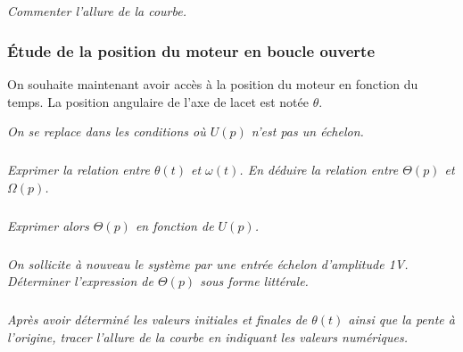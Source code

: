 \documentclass[11pt,oneside]{article}
\begin{document}
\subparagraph{}
\textit{Commenter l'allure de la courbe.}


\subsubsection*{Étude de la position du moteur en boucle ouverte}
On souhaite maintenant avoir accès à la position du moteur en fonction du temps. La position angulaire de l'axe de lacet est notée $\theta$. 

\textit{On se replace dans les conditions où $U(p)$ n'est pas un échelon.}




\subparagraph{}
\textit{Exprimer la relation entre $\theta(t)$ et $\omega(t)$. En déduire la relation entre $\Theta(p)$ et $\Omega(p)$.}




\subparagraph{}
\textit{Exprimer alors $\Theta(p)$ en fonction de $U(p)$.}


\subparagraph{}
\textit{On sollicite à nouveau le système par une entrée échelon d'amplitude 1V. Déterminer l'expression de $\Theta(p)$ sous forme littérale.}



\subparagraph{}
\textit{Après avoir déterminé les valeurs initiales et finales de $\theta(t)$ ainsi que la pente à l'origine, tracer l'allure de la courbe en indiquant les valeurs numériques.}
\end{document}
